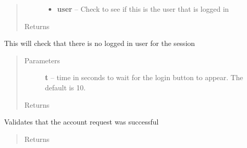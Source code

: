 \documentclass[letterpaper,10pt,english]{sphinxmanual}
\begin{document}
\begin{fulllineitems}
\begin{fulllineitems}
\begin{quote}
\begin{description}
\begin{itemize}
\item {} 
\textbf{user} -- Check to see if this is the user that is logged in

\end{itemize}

\item[{Returns}] \leavevmode


\end{description}\end{quote}

\end{fulllineitems}


\begin{fulllineitems}
\label{STD/WebUI:WebUI.WebUI.WebUI.check_logoff}
This will check that there is no logged in user for the session
\begin{quote}\begin{description}
\item[{Parameters}] \leavevmode
\textbf{t} -- time in seconds to wait for the login button to appear. The default is 10.

\item[{Returns}] \leavevmode


\end{description}\end{quote}

\end{fulllineitems}


\begin{fulllineitems}
\label{STD/WebUI:WebUI.WebUI.WebUI.check_request_account}
Validates that the account request was successful
\begin{quote}\begin{description}
\item[{Returns}] \leavevmode


\end{description}\end{quote}

\end{fulllineitems}



\end{fulllineitems}
\end{document}
